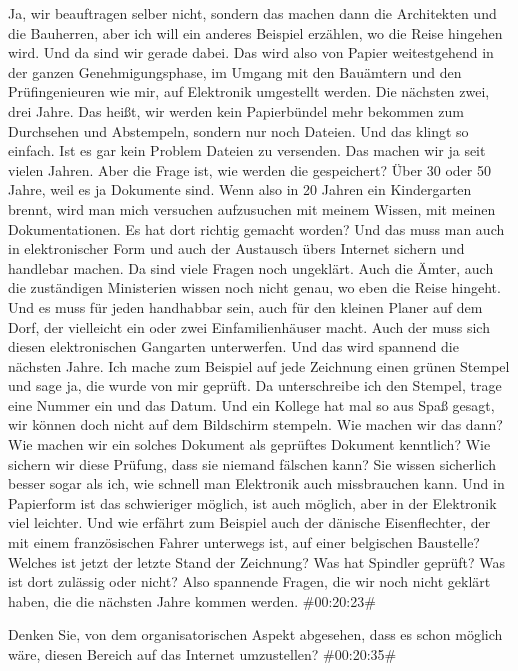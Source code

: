 \documentclass[a4paper, 12pt]{scrartcl}
\begin{document}
\begin{description}
\Andre Ja, wir beauftragen selber nicht, sondern das machen dann die Architekten und die Bauherren, aber ich will ein anderes Beispiel erzählen, wo die Reise hingehen wird. Und da sind wir gerade dabei. Das wird also von Papier weitestgehend in der ganzen Genehmigungsphase, im Umgang mit den Bauämtern und den Prüfingenieuren wie mir, auf Elektronik umgestellt werden. Die nächsten zwei, drei Jahre. Das heißt, wir werden kein Papierbündel mehr bekommen zum Durchsehen und Abstempeln, sondern nur noch Dateien. Und das klingt so einfach. Ist es gar kein Problem Dateien zu versenden. Das machen wir ja seit vielen Jahren. Aber die Frage ist, wie werden die gespeichert? Über 30 oder 50 Jahre, weil es ja Dokumente sind. Wenn also in 20 Jahren ein Kindergarten brennt, wird man mich versuchen aufzusuchen mit meinem Wissen, mit meinen Dokumentationen. Es hat dort richtig gemacht worden? Und das muss man auch in elektronischer Form und auch der Austausch übers Internet sichern und handlebar machen. Da sind viele Fragen noch ungeklärt. Auch die Ämter, auch die zuständigen Ministerien wissen noch nicht genau, wo eben die Reise hingeht. Und es muss für jeden handhabbar sein, auch für den kleinen Planer auf dem Dorf, der vielleicht ein oder zwei Einfamilienhäuser macht. Auch der muss sich diesen elektronischen Gangarten unterwerfen. Und das wird spannend die nächsten Jahre. Ich mache zum Beispiel auf jede Zeichnung einen grünen Stempel und sage ja, die wurde von mir geprüft. Da unterschreibe ich den Stempel, trage eine Nummer ein und das Datum. Und ein Kollege hat mal so aus Spaß gesagt, wir können doch nicht auf dem Bildschirm stempeln. Wie machen wir das dann? Wie machen wir ein solches Dokument als geprüftes Dokument kenntlich? Wie sichern wir diese Prüfung, dass sie niemand fälschen kann? Sie wissen sicherlich besser sogar als ich, wie schnell man Elektronik auch missbrauchen kann. Und in Papierform ist das schwieriger möglich, ist auch möglich, aber in der Elektronik viel leichter. Und wie erfährt zum Beispiel auch der dänische Eisenflechter, der mit einem französischen Fahrer unterwegs ist, auf einer belgischen Baustelle? Welches ist jetzt der letzte Stand der Zeichnung? Was hat Spindler geprüft? Was ist dort zulässig oder nicht? Also spannende Fragen, die wir noch nicht geklärt haben, die die nächsten Jahre kommen werden. \#00:20:23\#

\Fabian Denken Sie, von dem organisatorischen Aspekt abgesehen, dass es schon möglich wäre, diesen Bereich auf das Internet umzustellen? \#00:20:35\#


\end{description}
\end{document}
